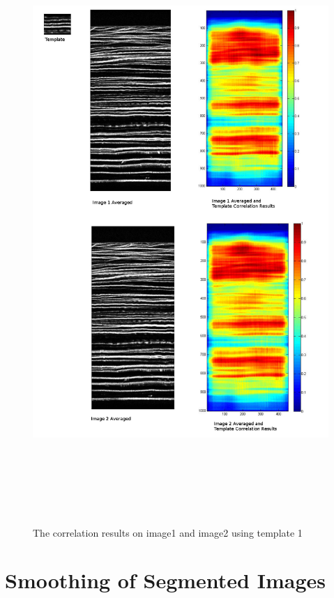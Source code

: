 \documentclass[11pt,psfig]{article}
\begin{document}
\begin{figure}[H]
\centering
\includegraphics[height=9in]{correlationResults_template2.jpg}
\caption{The correlation results on image1 and image2 using template 1}
\end{figure}

\section{Smoothing of Segmented Images}
\end{document}
